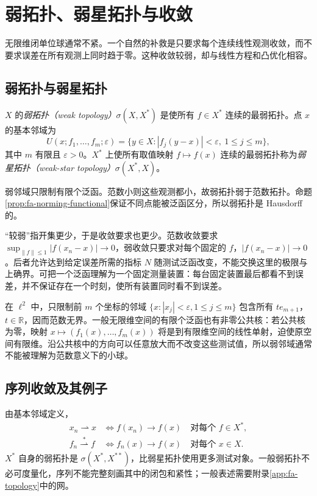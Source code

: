 \setcounter{chapter}{7} %
\chapter{弱拓扑、弱星拓扑与收敛}
\label{chap:fa-weak}

无限维闭单位球通常不紧。一个自然的补救是只要求每个连续线性观测收敛，而不要求误差在所有观测上同时趋于零。这种收敛较弱，却与线性方程和凸优化相容。

\section{弱拓扑与弱星拓扑}
\begin{definition}
$X$ 的\emph{弱拓扑（weak topology）}$\sigma(X,X^*)$ 是使所有 $f\in X^*$ 连续的最弱拓扑。点 $x$ 的基本邻域为
\[
 U(x;f_1,\ldots,f_m;\varepsilon)=
 \{y\in X:|f_j(y-x)|<\varepsilon,\ 1\leq j\leq m\},
\]
其中 $m$ 有限且 $\varepsilon>0$。$X^*$ 上使所有取值映射 $f\mapsto f(x)$ 连续的最弱拓扑称为\emph{弱星拓扑（weak-star topology）}$\sigma(X^*,X)$。
\end{definition}
弱邻域只限制有限个泛函。范数小则这些观测都小，故弱拓扑弱于范数拓扑。命题\ref{prop:fa-norming-functional}保证不同点能被泛函区分，所以弱拓扑是 Hausdorff 的。

“较弱”指开集更少，于是收敛要求也更少。范数收敛要求 $\sup_{\|f\|\leq1}|f(x_n-x)|\to0$，弱收敛只要求对每个固定的 $f$，$|f(x_n-x)|\to0$。后者允许达到给定误差所需的指标 $N$ 随测试泛函改变，不能交换这里的极限与上确界。可把一个泛函理解为一个固定测量装置：每台固定装置最后都看不到误差，并不保证存在一个时刻，使所有装置同时看不到误差。

在 $\ell^2$ 中，只限制前 $m$ 个坐标的邻域 $\{x:|x_j|<\varepsilon,1\leq j\leq m\}$ 包含所有 $te_{m+1}$，$t\in\mathbb R$，因而范数无界。一般无限维空间的有限个泛函也有非零公共核：若公共核为零，映射 $x\mapsto(f_1(x),\ldots,f_m(x))$ 将是到有限维空间的线性单射，迫使原空间有限维。沿公共核中的方向可以任意放大而不改变这些测试值，所以弱邻域通常不能被理解为范数意义下的小球。

\section{序列收敛及其例子}
由基本邻域定义，
\begin{align}
 x_n\rightharpoonup x
 &\iff f(x_n)\to f(x)\quad\text{对每个 }f\in X^*,
 \label{eq:fa-weak-convergence}\\
 f_n\overset{*}{\rightharpoonup}f
 &\iff f_n(x)\to f(x)\quad\text{对每个 }x\in X.
 \label{eq:fa-weak-star-convergence}
\end{align}
$X^*$ 自身的弱拓扑是 $\sigma(X^*,X^{**})$，比弱星拓扑使用更多测试对象。一般弱拓扑不必可度量化，序列不能完整刻画其中的闭包和紧性；一般表述需要附录\ref{app:fa-topology}中的网。

